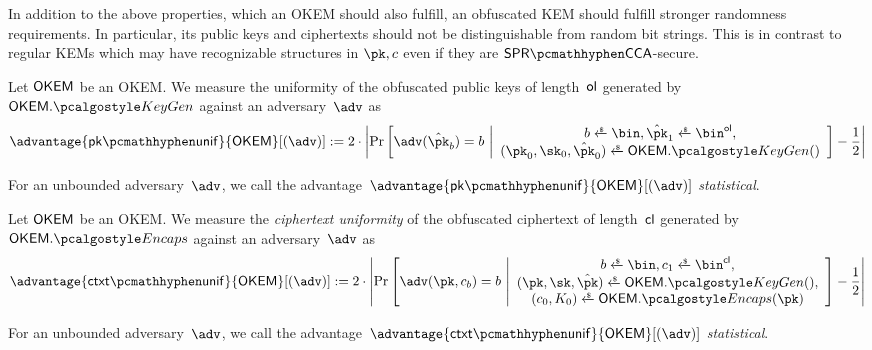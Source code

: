 In addition to the above properties, which an OKEM should also fulfill, an obfuscated KEM should fulfill stronger randomness requirements. In particular, its public keys and ciphertexts should not be distinguishable from random bit strings. This is in contrast to regular KEMs which may have recognizable structures in $\pk, c$ even if they are $\sprcca$-secure.

\begin{definition}\label{def:pk-uniformity}
    Let $\mathsf{OKEM}$ be an OKEM.
    We measure the uniformity of the obfuscated public keys of length~$\mathsf{ol}$ generated by $\OKEM.\kgen$ against an adversary~$\adv$ as
    \[
        \advantage{\pkunif}{\OKEM}[(\adv)]
        :=
        2 \cdot \left|
        \Pr\left[
            \adv(\pkobf_b) = b
        ~\middle|
            \begin{array}{c}
                b \getsr \bin, \pkobf_1 \getsr \bin^{\obfpklen}, \\
                (\pk_0, \sk_0, \pkobf_0) \getsr \OKEM.\kgen()
            \end{array}
        \right]
        - \frac{1}{2}
        \right|
    \]
    
    For an unbounded adversary~$\adv$, we call the advantage~$\advantage{\pkunif}{\OKEM}[(\adv)]$ \emph{statistical}.
\end{definition}

\begin{definition}\label{def:ctxt-uniformity}
    Let $\mathsf{OKEM}$ be an OKEM.
    We measure the \emph{ciphertext uniformity} of the obfuscated ciphertext of length~$\mathsf{cl}$ generated by $\OKEM.\encaps$ against an adversary~$\adv$ as
    \[
        \advantage{\ctxtunif}{\OKEM}[(\adv)] := 
        2 \cdot \left|
        \Pr\left[
            \adv(\pk, c_b) = b
        ~\middle|
            \begin{array}{c}
                b \getsr \bin, c_1 \getsr \bin^{\obfctxtlen}, \\
                (\pk,\sk,\pkobf) \getsr \OKEM.\kgen(),\\
                (c_0, K_0) \getsr \OKEM.\encaps(\pk)
            \end{array}
        \right]
        - \frac{1}{2}
        \right|
    \]
    
    For an unbounded adversary~$\adv$, we call the advantage~$\advantage{\ctxtunif}{\OKEM}[(\adv)] $ \emph{statistical}.
\end{definition}


